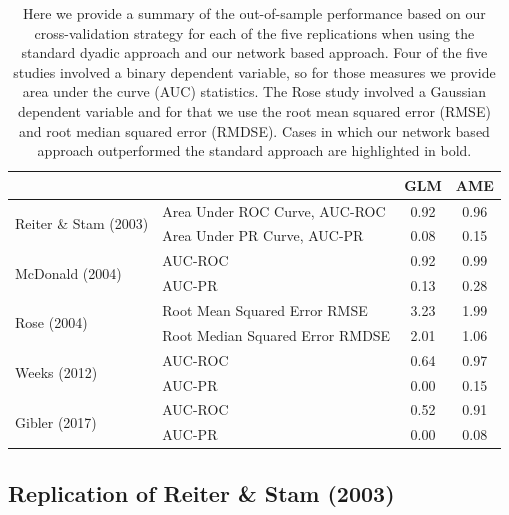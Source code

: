 \begin{table}[ht]
\centering
	\begin{tabular}{l|l cc}
	~ & ~ & GLM & AME \\
	\toprule
\multirow{2}{*}{Reiter \& Stam (2003)} & Area Under ROC Curve, AUC-ROC & 0.92 & {0.96} \\
		~ & Area Under PR Curve, AUC-PR & 0.08 &  {0.15} \\		\midrule
\multirow{2}{*}{McDonald (2004)} & AUC-ROC & 0.92 &  {0.99} \\
		~ & AUC-PR & 0.13 &  {0.28} \\		\midrule
\multirow{2}{*}{Rose (2004)} & Root Mean Squared Error RMSE & 3.23 &  {1.99} \\
		~ & Root Median Squared Error RMDSE & 2.01 &  {1.06} \\	\midrule
\multirow{2}{*}{Weeks (2012)} & AUC-ROC & 0.64 &  {0.97} \\
		~ & AUC-PR & 0.00 &  {0.15} \\		\midrule
\multirow{2}{*}{Gibler (2017)} & AUC-ROC & 0.52 &  {0.91} \\
		~ & AUC-PR & 0.00 &  {0.08} \\			\bottomrule
	\end{tabular}
	\caption{Here we provide a summary of the out-of-sample performance based on our cross-validation strategy for each of the five replications when using the standard dyadic approach and our network based approach. Four of the five studies involved a binary dependent variable, so for those measures we provide area under the curve (AUC) statistics. The Rose study involved a Gaussian dependent variable and for that we use the root mean squared error (RMSE) and root median squared error (RMDSE). Cases in which our network based approach outperformed the standard approach are highlighted in bold.}
	\label{tab:modelPerfSumm}
\end{table}
\FloatBarrier

\subsection{Replication of Reiter \& Stam (2003)}

